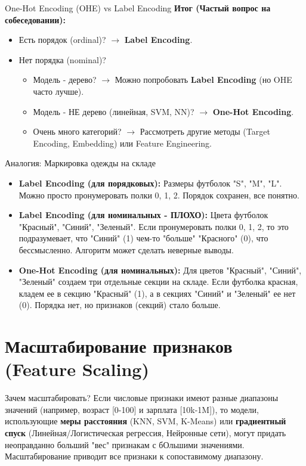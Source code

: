 \begin{textbox}{One-Hot Encoding (OHE) vs Label Encoding}
    \textbf{Итог (Частый вопрос на собеседовании):}
    \begin{itemize}
        \item Есть порядок (ordinal)? $\rightarrow$ \textbf{Label Encoding}.
        \item Нет порядка (nominal)?
            \begin{itemize}
                \item Модель - дерево? $\rightarrow$ Можно попробовать \textbf{Label Encoding} (но OHE часто лучше).
                \item Модель - НЕ дерево (линейная, SVM, NN)? $\rightarrow$ \textbf{One-Hot Encoding}.
                \item Очень много категорий? $\rightarrow$ Рассмотреть другие методы (Target Encoding, Embedding) или Feature Engineering.
            \end{itemize}
    \end{itemize}
\end{textbox}

\begin{myexampleblock}{Аналогия: Маркировка одежды на складе}
    \begin{itemize}
        \item \textbf{Label Encoding (для порядковых):} Размеры футболок "S", "M", "L". Можно просто пронумеровать полки 0, 1, 2. Порядок сохранен, все понятно.
        \item \textbf{Label Encoding (для номинальных - ПЛОХО):} Цвета футболок "Красный", "Синий", "Зеленый". Если пронумеровать полки 0, 1, 2, то это подразумевает, что "Синий" (1) чем-то "больше" "Красного" (0), что бессмысленно. Алгоритм может сделать неверные выводы.
        \item \textbf{One-Hot Encoding (для номинальных):} Для цветов "Красный", "Синий", "Зеленый" создаем три отдельные секции на складе. Если футболка красная, кладем ее в секцию "Красный" (1), а в секциях "Синий" и "Зеленый" ее нет (0). Порядка нет, но признаков (секций) стало больше.
    \end{itemize}
\end{myexampleblock}

\section{Масштабирование признаков (Feature Scaling)}

\begin{myblock}{Зачем масштабировать?}
    Если числовые признаки имеют разные диапазоны значений (например, возраст [0-100] и зарплата [10k-1M]), то модели, использующие \textbf{меры расстояния} (KNN, SVM, K-Means) или \textbf{градиентный спуск} (Линейная/Логистическая регрессия, Нейронные сети), могут придать неоправданно больший "вес" признакам с бОльшими значениями. Масштабирование приводит все признаки к сопоставимому диапазону.
\end{myblock}

